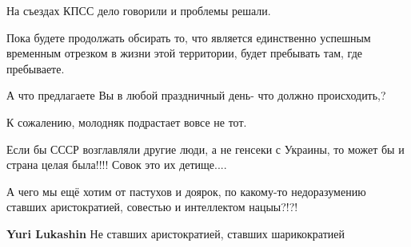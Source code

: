 \begin{itemize}
На съездах КПСС дело говорили и проблемы решали.

Пока будете продолжать обсирать то, что является единственно успешным временным
отрезком в жизни этой территории, будет пребывать там, где пребываете.


 

А что предлагаете Вы в любой праздничный день- что должно происходить,?


 
К сожалению, молодняк подрастает вовсе не тот.

 
Если бы СССР возглавляли другие люди, а не генсеки с Украины, то может бы и
страна целая была!!!! Совок это их детище....


 

А чего мы ещё хотим от пастухов и доярок, по какому-то недоразумению ставших
аристократией, совестью и интеллектом нацыы?!?!

\begin{itemize}
 
\textbf{Yuri Lukashin} Не ставших аристократией, ставших шарикократией

 

\end{itemize}
\end{itemize}
